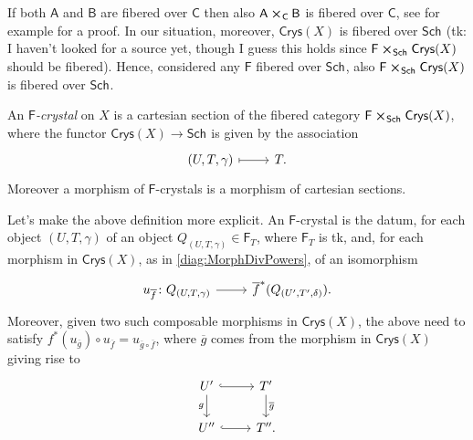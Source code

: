 \documentclass[../Main]{subfiles}
\begin{document}
\begin{rem}[]
	If both $\mathsf{A}$ and $\mathsf{B}$ are fibered over $\mathsf{C}$ then
	also $\mathsf{A} \cross_{ \mathsf{C} } \mathsf{B}$ is fibered over $\mathsf{C}$,
	see for example
	\cite[\href{https://stacks.math.columbia.edu/tag/02XQ}{Lemma 02XQ}]{SP}
	for a proof.
	In our situation, moreover, $\mathsf{Crys}(X)$ is fibered over $\mathsf{Sch}_{  }$
	(tk: I haven't looked for a source yet, though I guess this holds since
	$\mathsf{F} \cross_{ \mathsf{Sch}_{  } } \mathsf{Crys}(X)$ should be fibered).
	Hence, considered any $\mathsf{F}$ fibered over $\mathsf{Sch}_{  }$,
	also $\mathsf{F} \cross_{ \mathsf{Sch}_{  } } \mathsf{Crys}(X)$
	is fibered over $\mathsf{Sch}_{ }$.
\end{rem}


\begin{defn}
	An {\em $\mathsf{F}$-crystal} on $X$ is a
	cartesian section of the fibered category
	$\mathsf{F} \cross_{ \mathsf{Sch}_{  } } \mathsf{Crys}(X)$, where
	the functor $\mathsf{Crys}(X) \to \mathsf{Sch}_{  }$ is given
	by the association
	\begin{equation*}
	\begin{tikzcd}[row sep = 0ex
		,/tikz/column 1/.append style={anchor=base east}
		,/tikz/column 2/.append style={anchor=base west}]
		\left(U, T, \gamma\right) \arrow[r, "", mapsto] & T
	.\end{tikzcd}
	\end{equation*} 
	Moreover a morphism of $\mathsf{F}$-crystals is a
	morphism of cartesian sections.
\end{defn}


\begin{rem}[]
	Let's make the above definition more explicit.
	An $\mathsf{F}$-crystal is the datum, for each object
	$\left(U, T, \gamma\right)$ of an object
	$Q_{\left(U, T, \gamma\right)} \in \mathsf{F}_T$, where
	$\mathsf{F}_T$ is tk,
	and, for each morphism in $\mathsf{Crys}(X)$, as in \cref{diag:MorphDivPowers},
	of an isomorphism
	\begin{equation*}
	\begin{tikzcd}[row sep = 0ex
		,/tikz/column 1/.append style={anchor=base east}
		,/tikz/column 2/.append style={anchor=base west}]
		u_{\overline{f}}\colon 
		Q_{\left(U, T, \gamma\right)}
		\arrow[r, "", rightarrow] &
		\overline{f}^* (Q_{\left(U', T', \delta \right)})
	.\end{tikzcd}
	\end{equation*} 
	Moreover, given two such composable morphisms in $\mathsf{Crys}(X)$,
	the above need to satisfy $f^*(u_{\overline{g}}) \circ u_{\overline{f}} =
	u_{\overline{g} \circ \overline{f}}$,
	where $\overline{g}$ comes from the morphism
	in $\mathsf{Crys}(X)$ giving rise to
	\begin{equation*}
	\begin{tikzcd}
		U' \arrow[d, "g"', rightarrow] \arrow[r, "", hookrightarrow] &
		T' \arrow[d, "\overline{g}", rightarrow] \\
		U'' \arrow[r, "", hookrightarrow] &
		T''
	.\end{tikzcd}
	\end{equation*}
\end{rem}
\end{document}
